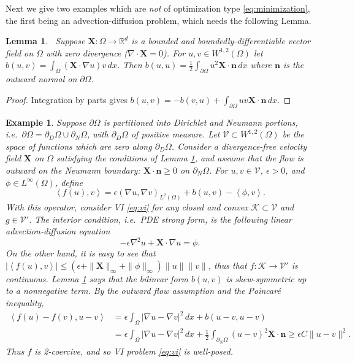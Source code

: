 \documentclass[letterpaper,final,12pt,reqno]{amsart}
\theoremstyle{cstyle}
\newtheorem{lemma}[theorem]{Lemma}
\theoremstyle{cstyle*}
\theoremstyle{dstyle}
\newtheorem{example}[theorem]{Example}
\numberwithin{equation}{section}
\numberwithin{figure}{section}
\numberwithin{table}{section}
\numberwithin{theorem}{section}
\newcommand{\eps}{\epsilon}
\newcommand{\RR}{\mathbb{R}}
\newcommand{\grad}{\nabla}
\newcommand{\Div}{\nabla\cdot}
\newcommand{\bn}{\mathbf{n}}
\newcommand{\bX}{\mathbf{X}}
\newcommand{\cK}{\mathcal{K}}
\newcommand{\cV}{\mathcal{V}}
\newcommand{\ip}[2]{\left<#1,#2\right>}
\begin{document}
Next we give two examples which are \emph{not} of optimization type \eqref{eq:minimization}, the first being an advection-diffusion problem, which needs the following Lemma.

\begin{lemma}  \label{lem:advectionskew}  \cite{Elmanetal2014}\,  Suppose $\bX :\Omega \to \RR^d$ is a bounded and boundedly-differentiable vector field on $\Omega$ with zero divergence ($\Div \bX=0$).  For $u,v \in W^{1,2}(\Omega)$ let $b(u,v) = \int_\Omega (\bX \cdot \grad u) v\,dx$.  Then $b(u,u) = \frac{1}{2} \int_{\partial \Omega} u^2 \bX\cdot \bn\,dx$ where $\bn$ is the outward normal on $\partial \Omega$.
\end{lemma}

\begin{proof}
Integration by parts gives $b(u,v) = - b(v,u) + \int_{\partial \Omega} uv \bX\cdot \bn\,dx$.
\end{proof}

\begin{example}  \label{ex:advectiondiffusion}  Suppose $\partial\Omega$ is partitioned into Dirichlet and Neumann portions, i.e.~$\partial\Omega = \partial_D\Omega \cup \partial_N\Omega$, with $\partial_D\Omega$ of positive measure.  Let $\cV \subset W^{1,2}(\Omega)$ be the space of functions which are zero along $\partial_D\Omega$.  Consider a divergence-free velocity field $\bX$ on $\Omega$ satisfying the conditions of Lemma \ref{lem:advectionskew}, and assume that the flow is outward on the Neumann boundary: $\bX \cdot \bn \ge 0$ on $\partial_N\Omega$.  For $u,v \in \cV$, $\eps>0$, and $\phi \in L^\infty(\Omega)$, define
\begin{equation}
\ip{f(u)}{v} = \eps \left(\grad u, \grad v\right)_{L^2(\Omega)} + b(u,v) - \ip{\phi}{v}. \label{eq:advectiondiffusion}
\end{equation}
With this operator, consider VI \eqref{eq:vi} for any closed and convex $\cK \subset \cV$ and $g\in\cV'$.  The interior condition, i.e.~PDE strong form, is the following linear advection-diffusion equation
\begin{equation}
-\eps \grad^2 u + \bX\cdot \grad u = \phi.
\label{eq:pdeadvectiondiffusion}
\end{equation}
On the other hand, it is easy to see that $|\ip{f(u)}{v}| \le (\eps + \|\bX\|_\infty + \|\phi\|_\infty) \|u\| \|v\|$, thus that $f:\cK \to \cV'$ is continuous.  Lemma \ref{lem:advectionskew} says that the bilinear form $b(u,v)$ is skew-symmetric up to a nonnegative term.  By the outward flow assumption and the Poincar\'e inequality,
\begin{align*}
\ip{f(u)-f(v)}{u-v} &= \eps \int_\Omega |\grad u - \grad v|^2\,dx + b(u-v,u-v) \\
                    &= \eps \int_\Omega |\grad u - \grad v|^2\,dx + \frac{1}{2} \int_{\partial_N\Omega} (u-v)^2 \bX\cdot\bn \ge \eps C \|u-v\|^2.
\end{align*}
Thus $f$ is 2-coercive, and so VI problem \eqref{eq:vi} is well-posed.
\end{example}
\end{document}
